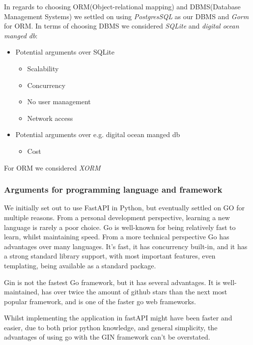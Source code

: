 In regards to choosing ORM(Object-relational mapping) and DBMS(Database Management Systems) we settled on using \textit{PostgresSQL} as our DBMS and \textit{Gorm} for ORM. In terms of choosing DBMS we considered \textit{SQLite} and \textit{digital ocean manged db}:
\begin{itemize}
    \item Potential arguments over SQLite 
    \begin{itemize}
        \item Scalability
        \item Concurrency
        \item No user management
        \item Network access        
    \end{itemize}
    \item Potential arguments over e.g. digital ocean manged db
    \begin{itemize}
        \item Cost
    \end{itemize}
\end{itemize}

For ORM we considered \textit{XORM}

\subsubsection{Arguments for programming language and framework}

We initially set out to use FastAPI in Python, but eventually settled on GO for multiple reasons. From a personal development perspective, learning a new language is rarely a poor choice. Go is well-known for being relatively fast to learn, whilst maintaining speed. From a more technical perspective Go has advantages over many languages. It's fast, it has concurrency built-in, and it has a strong standard library support, with most important features, even templating, being available as a standard package.

Gin is not the fastest Go framework, but it has several advantages. It is well-maintained, has over twice the amount of github stars than the next most popular framework, and is one of the faster go web frameworks.

Whilst implementing the application in fastAPI might have been faster and easier, due to both prior python knowledge, and general simplicity, the advantages of using go with the GIN framework can't be overstated. 

